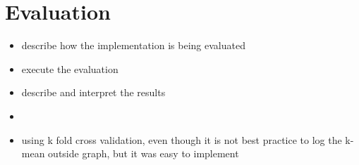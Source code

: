 \section{Evaluation}
\label{sec:evaluation}
\begin{itemize}
	\item describe how the implementation is being evaluated
	\item execute the evaluation
	\item describe and interpret the results
	\item  
	\item using k fold cross validation, even though it is not best practice to log the k-mean outside graph, but it was easy to implement
\end{itemize}